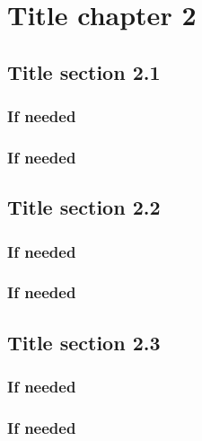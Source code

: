 \doublespacing %

\chapter{Title chapter 2}
\label{ch2}

\begin{spacing}{1} %
\minitoc %
\end{spacing} %
\thesisspacing %


\kant[1]

\section{Title section 2.1}

\kant[1-2]

\subsection{If needed}

\kant[1]

\subsection{If needed}

\kant[1]

\section{Title section 2.2}

\kant[1-2]

\subsection{If needed}

\kant[1]

\subsection{If needed}

\kant[1]

\section{Title section 2.3}

\kant[1-2]

\subsection{If needed}

\kant[1]

\subsection{If needed}

\kant[1]